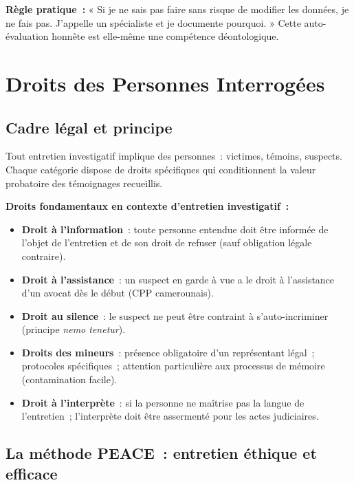\textbf{Règle pratique~:} « Si je ne sais pas faire sans risque de
modifier les données, je ne fais pas. J'appelle un spécialiste et
je documente pourquoi. » Cette auto-évaluation honnête est elle-même
une compétence déontologique.

\section{Droits des Personnes Interrogées}
\label{sec:droits-personnes}

\subsection{Cadre légal et principe}

Tout entretien investigatif implique des personnes~: victimes, témoins,
suspects. Chaque catégorie dispose de droits spécifiques qui conditionnent
la valeur probatoire des témoignages recueillis.

\begin{boxjuris}
\textbf{Droits fondamentaux en contexte d'entretien investigatif~:}
\begin{itemize}
    \item \textbf{Droit à l'information}~: toute personne entendue
          doit être informée de l'objet de l'entretien et de son
          droit de refuser (sauf obligation légale contraire).
    \item \textbf{Droit à l'assistance}~: un suspect en garde à vue
          a le droit à l'assistance d'un avocat dès le début
          (CPP camerounais).
    \item \textbf{Droit au silence}~: le suspect ne peut être contraint
          à s'auto-incriminer (principe \textit{nemo tenetur}).
    \item \textbf{Droits des mineurs}~: présence obligatoire d'un
          représentant légal~; protocoles spécifiques~; attention
          particulière aux processus de mémoire (contamination facile).
    \item \textbf{Droit à l'interprète}~: si la personne ne maîtrise
          pas la langue de l'entretien~; l'interprète doit être
          assermenté pour les actes judiciaires.
\end{itemize}
\end{boxjuris}

\subsection{La méthode PEACE~: entretien éthique et efficace}

